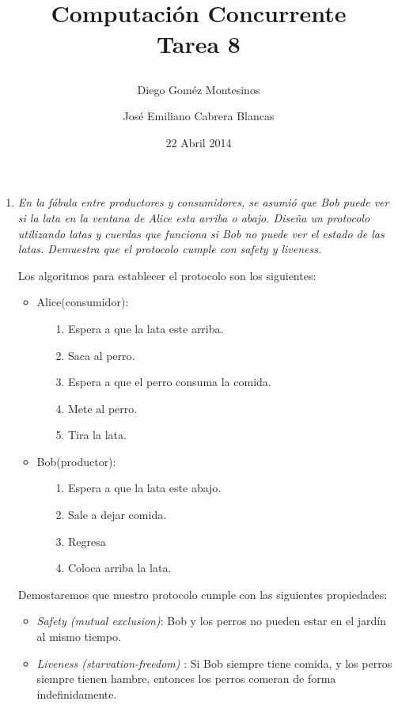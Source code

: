 \documentclass{article}
\title{ Computación Concurrente \\ \Large{Tarea 8}
\author{
  Diego Goméz Montesinos
  \and
  José Emiliano Cabrera Blancas
  }
\date{22 Abril 2014}
}
\begin{document}
\maketitle
\begin{enumerate}
  
\item{
    \textsl{
      En la fábula entre productores y consumidores, se asumió que Bob
      puede ver si la lata en la ventana de Alice esta arriba o
      abajo. Diseña un protocolo utilizando latas y cuerdas que
      funciona si Bob no puede ver el estado de las latas. Demuestra
      que el protocolo cumple con safety y liveness.
    }
    
    Los algoritmos para establecer el protocolo son los siguientes:
    \begin{itemize}
      \item{
          Alice(consumidor):
          \begin{itemize}
            \item[1.]{Espera a que la lata este arriba.}
            \item[2.]{Saca al perro.}
            \item[3.]{Espera a que el perro consuma la comida.}
            \item[4.]{Mete al perro.}
            \item[5.]{Tira la lata.}
          \end{itemize}
        }

      \item{
          Bob(productor):
          \begin{itemize}
            \item[1.]{Espera  a que la lata este abajo.}
            \item[2.]{Sale a dejar comida.}
            \item[3.]{Regresa}
            \item[4.]{Coloca arriba la lata.}
          \end{itemize}
        }
    \end{itemize}

    Demostaremos que nuestro protocolo cumple con las siguientes
    propiedades:

    \begin{itemize}
      \item{\textit{Safety (mutual exclusion)}: Bob y los perros no
          pueden estar en el jardín al mismo tiempo.}
      \item{\textit{Liveness (starvation-freedom) }: Si Bob siempre
          tiene comida, y los perros siempre tienen hambre, entonces
          los perros comeran de forma indefinidamente.}


\end{itemize}}
\end{enumerate}
\end{document}
